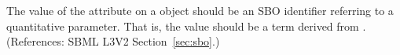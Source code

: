 The value of the attribute  on a \Parameter object should be
an SBO identifier referring to a quantitative parameter.  That is, the
value should be a term derived from \sboparameter.  (References: SBML
 L3V2 Section~\ref{sec:sbo}.)
